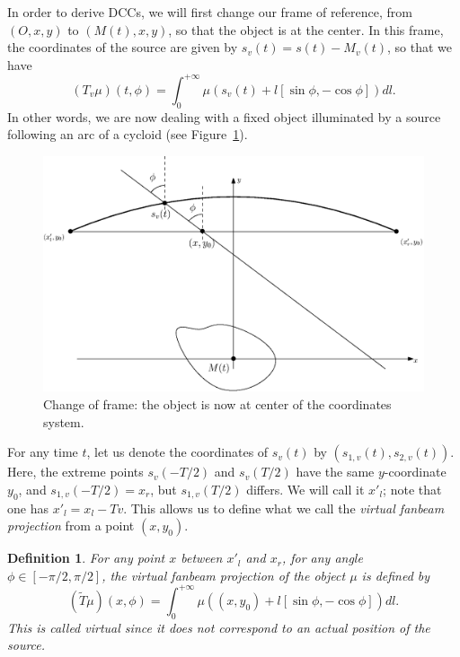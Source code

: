 \documentclass[a4paper]{article}
\numberwithin{equation}{section}
\newtheorem{definition}{Definition}
\begin{document}
In order to derive DCCs, we will first change our frame of reference, from $\left(O, x, y\right)$ to $\left(M(t), x, y\right)$, so that the object is at the center. In this frame, the coordinates of the source are given by $s_v(t)=s(t)-M_v(t)$, so that we have
\begin{equation}
	(T_v\mu)(t,\phi) = \int_0^{+\infty} \mu \left( s_v(t) + l \left[ \sin \phi, -\cos \phi \right] \right) dl.
\end{equation}
In other words, we are now dealing with a fixed object illuminated by a source following an arc of a cycloid (see Figure~\ref{fig:change_frame}).
\begin{figure}[!ht]
	\centering
	\includegraphics[width=12cm]{figs/frame_object.eps}
	\caption{Change of frame: the object is now at center of the coordinates system.\label{fig:change_frame}}
\end{figure}

For any time $t$, let us denote the coordinates of $s_v(t)$ by $\left( s_{1,v}(t), s_{2,v}(t) \right)$. Here, the extreme points $s_v(-T/2)$ and $s_v(T/2)$ have the same $y$-coordinate $y_0$, and $s_{1,v}(-T/2)=x_r$, but $s_{1,v}(T/2)$ differs. We will call it $x'_l$; note that one has $x'_l = x_l - Tv$.
This allows us to define what we call the \emph{virtual fanbeam projection} from a point $(x,y_0)$.
\begin{definition}
	For any point $x$ between $x'_l$ and $x_r$, for any angle $\phi \in \left[ -\pi/2, \pi/2\right]$, the \emph{virtual fanbeam projection} of the object $\mu$ is defined by
\begin{equation}
	\left( \tilde{T}\mu	\right)(x,\phi) = \int_0^{+\infty} \mu \left( (x,y_0) + l \left[ \sin \phi, -\cos \phi \right] \right) dl.
\end{equation}
This is called \emph{virtual} since it does not correspond to an actual position of the source.
\end{definition}
\end{document}
